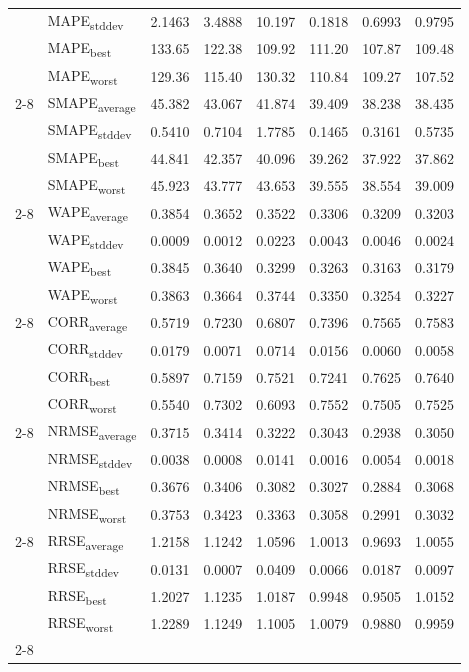 {\begin{longtable}{l l c c c c c c}
 & MAPE\textsubscript{stddev} & 2.1463 & 3.4888 & 10.197 & 0.1818 & 0.6993 & 0.9795 \\
 & MAPE\textsubscript{best} & 133.65 & 122.38 & 109.92 & 111.20 & 107.87 & 109.48 \\
 & MAPE\textsubscript{worst} & 129.36 & 115.40 & 130.32 & 110.84 & 109.27 & 107.52 \\
\cmidrule(lr){2-8}
\multirow{4}{*}{TCN} & SMAPE\textsubscript{average} & 45.382 & 43.067 & 41.874 & 39.409 & 38.238 & 38.435 \\
 & SMAPE\textsubscript{stddev} & 0.5410 & 0.7104 & 1.7785 & 0.1465 & 0.3161 & 0.5735 \\
 & SMAPE\textsubscript{best} & 44.841 & 42.357 & 40.096 & 39.262 & 37.922 & 37.862 \\
 & SMAPE\textsubscript{worst} & 45.923 & 43.777 & 43.653 & 39.555 & 38.554 & 39.009 \\
\cmidrule(lr){2-8}
\multirow{4}{*}{TCN} & WAPE\textsubscript{average} & 0.3854 & 0.3652 & 0.3522 & 0.3306 & 0.3209 & 0.3203 \\
 & WAPE\textsubscript{stddev} & 0.0009 & 0.0012 & 0.0223 & 0.0043 & 0.0046 & 0.0024 \\
 & WAPE\textsubscript{best} & 0.3845 & 0.3640 & 0.3299 & 0.3263 & 0.3163 & 0.3179 \\
 & WAPE\textsubscript{worst} & 0.3863 & 0.3664 & 0.3744 & 0.3350 & 0.3254 & 0.3227 \\
\cmidrule(lr){2-8}
\multirow{4}{*}{TCN} & CORR\textsubscript{average} & 0.5719 & 0.7230 & 0.6807 & 0.7396 & 0.7565 & 0.7583 \\
 & CORR\textsubscript{stddev} & 0.0179 & 0.0071 & 0.0714 & 0.0156 & 0.0060 & 0.0058 \\
 & CORR\textsubscript{best} & 0.5897 & 0.7159 & 0.7521 & 0.7241 & 0.7625 & 0.7640 \\
 & CORR\textsubscript{worst} & 0.5540 & 0.7302 & 0.6093 & 0.7552 & 0.7505 & 0.7525 \\
\cmidrule(lr){2-8}
\multirow{4}{*}{TCN} & NRMSE\textsubscript{average} & 0.3715 & 0.3414 & 0.3222 & 0.3043 & 0.2938 & 0.3050 \\
 & NRMSE\textsubscript{stddev} & 0.0038 & 0.0008 & 0.0141 & 0.0016 & 0.0054 & 0.0018 \\
 & NRMSE\textsubscript{best} & 0.3676 & 0.3406 & 0.3082 & 0.3027 & 0.2884 & 0.3068 \\
 & NRMSE\textsubscript{worst} & 0.3753 & 0.3423 & 0.3363 & 0.3058 & 0.2991 & 0.3032 \\
\cmidrule(lr){2-8}
\multirow{4}{*}{TCN} & RRSE\textsubscript{average} & 1.2158 & 1.1242 & 1.0596 & 1.0013 & 0.9693 & 1.0055 \\
 & RRSE\textsubscript{stddev} & 0.0131 & 0.0007 & 0.0409 & 0.0066 & 0.0187 & 0.0097 \\
 & RRSE\textsubscript{best} & 1.2027 & 1.1235 & 1.0187 & 0.9948 & 0.9505 & 1.0152 \\
 & RRSE\textsubscript{worst} & 1.2289 & 1.1249 & 1.1005 & 1.0079 & 0.9880 & 0.9959 \\
\cmidrule(lr){2-8}
\end{longtable}
}